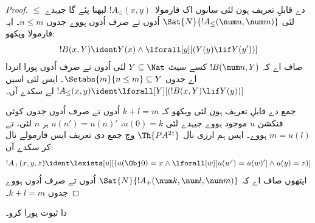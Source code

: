 \documentclass[../../../include/open-logic-section]{subfiles}
\begin{document}
\begin{proof}
$\le$ دے قابلِ تعریف ہون لئی سانوں اک فارمولا~$!A_\le(x, y)$
لبھنا پئے گا جیہدے لئی $\Sat{N}{!A_\le(\num n, \num m)}$ اُدوں
تے صرف اُدوں ہووے جدوں $n \le m$۔ ایہ فارمولا ویکھو:
\[
!B(x, Y) \ident Y(x) \land \lforall[y][(Y(y) \lif Y(y'))]
\]
صاف اے کہ $!B(\num n, Y)$ کسے سیٹ $Y \subseteq \Nat$ لئی اُدوں
تے صرف اُدوں پورا اتردا اے جدوں
$\Setabs{m}{n \le m} \subseteq Y$۔ ایس لئی اسیں
$!A_\le(x, y) \ident
\lforall[Y][(!B(x, Y) \lif Y(y))]$ لے سکدے آں۔

جمع دے قابلِ تعریف ہون لئی ویکھو کہ $k+l=m$ اُدوں تے صرف اُدوں
جدوں کوئی فنکشن $u$ موجود ہووے جیہدے لئی $u(0)=k$،
$u(n')=u(n)'$ ہر $n$ لئی، تے $m = u(l)$ ہووے۔ ایس ہم ارزی
نال $\Th{PA^{2\dagger}}$ وچ جمع دی تعریف ایس فارمولے نال کر سکدے آں:
\[
!A_+(x,y,z) \ident \lexists[u][(u(\Obj 0)=x \land \lforall[w][u(w')=u
 (w)'] \land u(y)=z)]
\] 
ایتھوں صاف اے کہ $\Sat{N}{!A_+(\num k, \num l, \num m)}$
اُدوں تے صرف اُدوں ہووے جدوں $k+l=m$۔
\end{proof}

\begin{prob}
 دا ثبوت پورا کرو۔
\end{prob}
\end{document}

